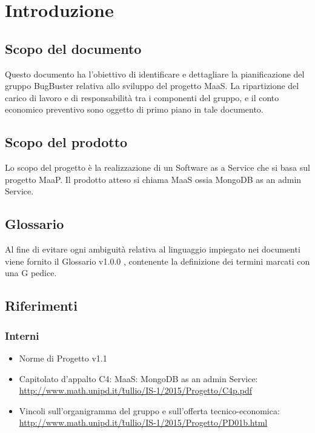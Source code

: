 \section{Introduzione}
\subsection{Scopo del documento}
Questo documento ha l’obiettivo di identificare e dettagliare la pianificazione del gruppo BugBuster
relativa allo sviluppo del progetto MaaS. La ripartizione del carico di lavoro e di responsabilità tra i
componenti del gruppo, e il conto economico preventivo sono oggetto di primo piano in tale documento.

\subsection{Scopo del prodotto}
Lo scopo del progetto è la realizzazione di un Software as a Service che si basa sul progetto MaaP. Il prodotto atteso si chiama MaaS ossia MongoDB as an admin Service.

\subsection{Glossario}
Al fine di evitare ogni ambiguità relativa al linguaggio impiegato nei documenti viene fornito il Glossario
v1.0.0 , contenente la definizione dei termini marcati con una G pedice.

\subsection{Riferimenti}
\subsubsection{Interni}
\begin{itemize}
\item Norme di Progetto v1.1
\item Capitolato d'appalto C4: MaaS: MongoDB as an admin Service: \\ \href{http://www.math.unipd.it/~tullio/IS-1/2015/Progetto/C4p.pdf}{http://www.math.unipd.it/\~tullio/IS-1/2015/Progetto/C4p.pdf} 
\item Vincoli sull’organigramma del gruppo e sull’offerta tecnico-economica: \\
\href{http://www.math.unipd.it/~tullio/IS-1/2015/Progetto/PD01b.html}{http://www.math.unipd.it/\~tullio/IS-1/2015/Progetto/PD01b.html}
\end{itemize}
